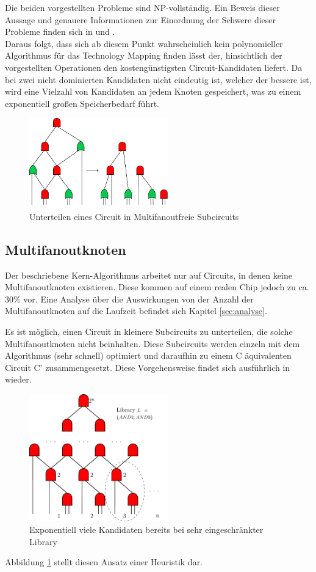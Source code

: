 \documentclass[11pt, a4paper, german]{article}
\newcommand{\TM}{Technology  Mapping }
\begin{document}
Die beiden vorgestellten Probleme sind NP-vollständig. Ein Beweis dieser Aussage und genauere Informationen zur Einordnung der Schwere dieser Probleme finden sich in \cite{ComplexitySynthesis} und \citep{Elbert}. \\
Daraus folgt, dass sich ab diesem Punkt wahrscheinlich  kein polynomieller Algorithmus für das \TM finden lässt der, hinsichtlich der vorgestellten Operationen den kostengünstigsten Circuit-Kandidaten liefert.
Da bei zwei nicht dominierten Kandidaten nicht eindeutig ist, welcher der bessere ist,  wird eine Vielzahl von Kandidaten an jedem Knoten gespeichert, was zu einem exponentiell großen Speicherbedarf führt. 
 \begin{figure}
		\includegraphics[width = 6cm]{pictures/compiled/ohne_highfanout_heu}
		\caption{Unterteilen eines Circuit in Multifanoutfreie Subcircuits}
		\label{bild:ohne_multifanout_heu}
\end{figure}
\newpage
\subsection{Multifanoutknoten}
\label{subsec:multifanout}
Der beschriebene Kern-Algorithmus arbeitet nur auf Circuits, in denen keine Multifanoutknoten existieren. Diese kommen auf einem realen Chip jedoch zu ca. $30\%$ vor.
Eine Analyse über die Auswirkungen von der Anzahl der Multifanoutknoten auf die Laufzeit befindet sich Kapitel \ref{sec:analyse}.

Es ist möglich, einen Circuit in kleinere Subcircuits zu unterteilen, die solche Multifanoutknoten nicht beinhalten. Diese Subcircuits werden einzeln mit dem Algorithmus (sehr schnell) optimiert und daraufhin zu einem C äquivalenten Circuit C' zusammengesetzt. Diese Vorgehensweise findet sich ausführlich in \cite{DAGON} wieder. 
   \begin{figure}%
\includegraphics[width= 6cm]{pictures/compiled/expo_kand}
\caption{Exponentiell viele Kandidaten bereits bei sehr eingeschränkter Library}
\label{bild:expo_kan}
\end{figure}
Abbildung \ref{bild:ohne_multifanout_heu} stellt diesen Ansatz einer Heuristik dar. \\
\end{document}

